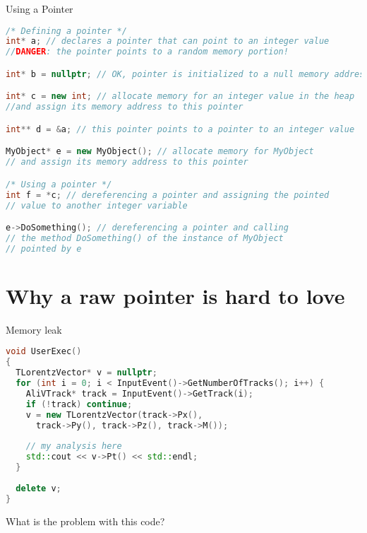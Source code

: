 \documentclass[xcolor={usenames,dvipsnames}]{beamer}
\begin{document}
\begin{frame}[fragile]{Using a Pointer}
\scriptsize
\begin{lstlisting}[language=C++]
/* Defining a pointer */
int* a; // declares a pointer that can point to an integer value
//DANGER: the pointer points to a random memory portion!

int* b = nullptr; // OK, pointer is initialized to a null memory address

int* c = new int; // allocate memory for an integer value in the heap 
//and assign its memory address to this pointer

int** d = &a; // this pointer points to a pointer to an integer value

MyObject* e = new MyObject(); // allocate memory for MyObject
// and assign its memory address to this pointer

/* Using a pointer */
int f = *c; // dereferencing a pointer and assigning the pointed
// value to another integer variable

e->DoSomething(); // dereferencing a pointer and calling
// the method DoSomething() of the instance of MyObject
// pointed by e
\end{lstlisting}
\end{frame}

\section{Why a raw pointer is hard to love}

\begin{frame}[fragile]{Memory leak}
\scriptsize
\begin{lstlisting}[language=C++]
void UserExec()
{
  TLorentzVector* v = nullptr;
  for (int i = 0; i < InputEvent()->GetNumberOfTracks(); i++) {
    AliVTrack* track = InputEvent()->GetTrack(i);
    if (!track) continue;
    v = new TLorentzVector(track->Px(), 
      track->Py(), track->Pz(), track->M());
    
    // my analysis here
    std::cout << v->Pt() << std::endl;
  }
  
  delete v;
}
\end{lstlisting}
\small 
\begin{center}
What is the problem with this code?
\end{center}
\end{frame}
\end{document}
